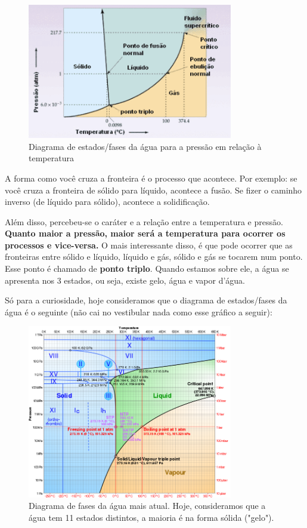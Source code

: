 \documentclass[12pt]{extarticle}
\newcommand{\<}{\langle}
\renewcommand{\>}{\rangle}
\theoremstyle{definition}
\begin{document}
\begin{enumerate}
    \begin{figure}[H]
        \centering
        \includegraphics[width=0.8\textwidth]{diagrama-agua.png}
        \caption{Diagrama de estados/fases da água para a pressão em relação à temperatura}
        \label{fig:phase_diagram}
    \end{figure}
    
    A forma como você cruza a fronteira é o processo que acontece. Por exemplo: se você cruza a fronteira de sólido para líquido, acontece a fusão. Se fizer o caminho inverso (de líquido para sólido), acontece a solidificação.
    
    Além disso, percebeu-se o caráter e a relação entre a temperatura e pressão. \textbf{Quanto maior a pressão, maior será a temperatura para ocorrer os processos e vice-versa.} O mais interessante disso, é que pode ocorrer que as fronteiras entre sólido e líquido, líquido e gás, sólido e gás se tocarem num ponto. Esse ponto é chamado de \textbf{ponto triplo}. Quando estamos sobre ele, a água se apresenta nos 3 estados, ou seja, existe gelo, água e vapor d'água.
    
    Só para a curiosidade, hoje consideramos que o diagrama de estados/fases da água é o seguinte (não cai no vestibular nada como esse gráfico a seguir):
    \begin{figure}[H]
        \centering
        \includegraphics[width=0.8\textwidth]{700px-Phase_diagram_of_water.svg.png}
        \caption{Diagrama de fases da água mais atual. Hoje, consideramos que a água tem 11 estados distintos, a maioria é na forma sólida ("gelo").}
        \label{fig:my_label}
    \end{figure}
\end{enumerate}
\end{document}
